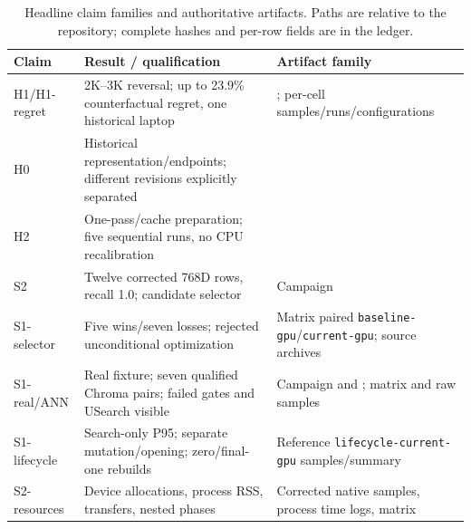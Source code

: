 \begin{table}[H]\centering\small
\caption{Headline claim families and authoritative artifacts. Paths are relative to the repository; complete hashes and per-row fields are in the ledger.}
\begin{tabular}{L{.17\linewidth}L{.37\linewidth}L{.35\linewidth}}
\toprule Claim & Result / qualification & Artifact family \\ \midrule
H1/H1-regret & 2K--3K reversal; up to 23.9\% counterfactual regret, one historical laptop & ; per-cell samples/runs/configurations \\
H0 & Historical representation/endpoints; different revisions explicitly separated &  \\
H2 & One-pass/cache preparation; five sequential runs, no CPU recalibration &  \\
S2 & Twelve corrected 768D rows, recall 1.0; candidate selector & Campaign  \\
S1-selector & Five wins/seven losses; rejected unconditional optimization & Matrix paired \texttt{baseline-gpu}/\texttt{current-gpu}; source archives \\
S1-real/ANN & Real fixture; seven qualified Chroma pairs; failed gates and USearch visible & Campaign  and ; matrix and raw samples \\
S1-lifecycle & Search-only P95; separate mutation/opening; zero/final-one rebuilds & Reference \texttt{lifecycle-current-gpu} samples/summary \\
S2-resources & Device allocations, process RSS, transfers, nested phases & Corrected native samples, process time logs, matrix \\
\bottomrule\end{tabular}\end{table}
